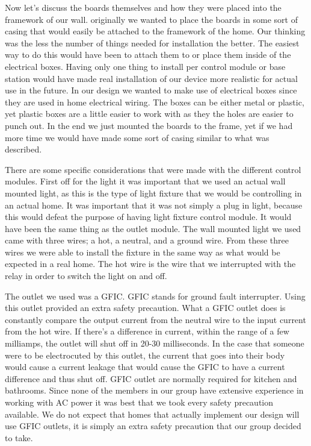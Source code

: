 Now let{}'s discuss the boards themselves and how they were placed into the
framework of our wall. originally we wanted to place the boards in some sort of casing that would easily be attached to the framework of the home. Our thinking was the less the number
of things needed for installation the better. The easiest way to do this would have been to attach them to or place them inside of the electrical boxes. Having only one thing to install per control module
or base station would have made real installation of our device more realistic for
actual use in the future. In our design we wanted to make use of electrical boxes
since they are used in home electrical wiring. The boxes can be either metal or
plastic, yet plastic boxes are a little easier to work with as they the holes
are easier to punch out. In the end we just mounted the boards to the frame, yet if we had more time we would have made some sort of casing similar to what was described. 
\cite{link15}

There are some specific considerations that were made with the different
control modules. First off for the light it was important that we used an actual
wall mounted light, as this is the type of light fixture that we would
be controlling in an actual home. It was important that it was not simply a plug in light,
because this would defeat the purpose of having light fixture control module. It would have been the same thing as the outlet module.
The wall mounted light we used came with three wires; a hot, a neutral, and a
ground wire. From these three wires we were able to install the fixture in
the same way as what would be expected in a real home. The hot wire is the wire
that we interrupted with the relay in order to switch the light on and
off.

The outlet we used was a GFIC. GFIC stands for ground fault
interrupter. Using this outlet provided an extra safety precaution. What a
GFIC outlet does is constantly compare the output current from the neutral wire
to the input current from the hot wire. If there{}'s a difference in current,
within the range of a few milliamps, the outlet will shut off in 20-30
milliseconds. In the case that someone were to be electrocuted by this outlet,
the current that goes into their body would cause a current leakage that would
cause the GFIC to have a current difference and thus shut off.  GFIC outlet are
normally required for kitchen and bathrooms. Since none of the members in our
group have extensive experience in working with AC power it was best that we
took every safety precaution available. We do not expect that homes that
actually implement our design will use GFIC outlets, it is simply an extra safety
precaution that our group decided to take. \cite{link16}


